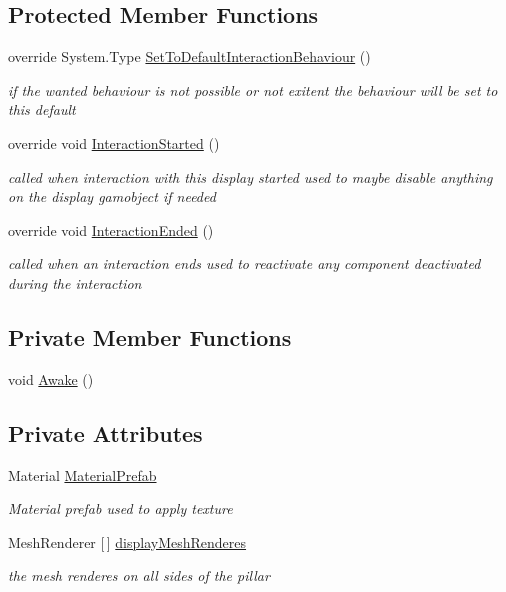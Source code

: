 \subsection*{Protected Member Functions}
\begin{DoxyCompactItemize}
\item 
override System.\+Type \mbox{\hyperlink{class_center_image_display_ac6ddf9c8df99ff76c0f508ba4e45a217}{Set\+To\+Default\+Interaction\+Behaviour}} ()
\begin{DoxyCompactList}\small\item\em if the wanted behaviour is not possible or not exitent the behaviour will be set to this default \end{DoxyCompactList}\item 
override void \mbox{\hyperlink{class_center_image_display_a2944541a38bcc65b7fff15200c9f0fc3}{Interaction\+Started}} ()
\begin{DoxyCompactList}\small\item\em called when interaction with this display started used to maybe disable anything on the display gamobject if needed \end{DoxyCompactList}\item 
override void \mbox{\hyperlink{class_center_image_display_ac78f5ea36aa445bb3d12124f1baf814d}{Interaction\+Ended}} ()
\begin{DoxyCompactList}\small\item\em called when an interaction ends used to reactivate any component deactivated during the interaction \end{DoxyCompactList}\end{DoxyCompactItemize}
\subsection*{Private Member Functions}
\begin{DoxyCompactItemize}
\item 
void \mbox{\hyperlink{class_center_image_display_a413c4767daa6cca041577ba63eb3b8d5}{Awake}} ()
\end{DoxyCompactItemize}
\subsection*{Private Attributes}
\begin{DoxyCompactItemize}
\item 
Material \mbox{\hyperlink{class_center_image_display_af22091d70f8772c7263ad852e3770619}{Material\+Prefab}}
\begin{DoxyCompactList}\small\item\em Material prefab used to apply texture \end{DoxyCompactList}\item 
Mesh\+Renderer \mbox{[}$\,$\mbox{]} \mbox{\hyperlink{class_center_image_display_a47f09ee02109c10416288b5022f193f8}{display\+Mesh\+Renderes}}
\begin{DoxyCompactList}\small\item\em the mesh renderes on all sides of the pillar \end{DoxyCompactList}\end{DoxyCompactItemize}
